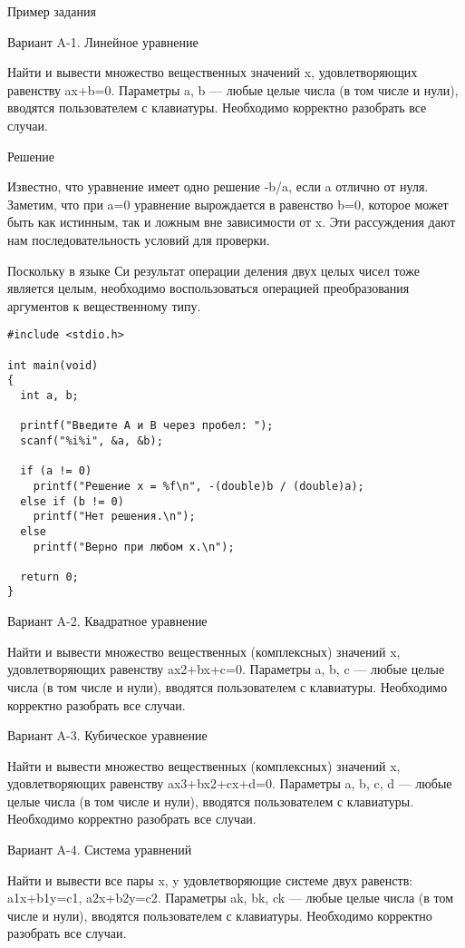 
Пример задания

Вариант A-1. Линейное уравнение

Найти и вывести множество вещественных значений x, удовлетворяющих равенству
ax+b=0. Параметры a, b — любые целые числа (в том числе и нули), вводятся
пользователем с клавиатуры. Необходимо корректно разобрать все случаи.

Решение

Известно, что уравнение имеет одно решение -b/a, если a отлично от нуля.
Заметим, что при a=0 уравнение вырождается в равенство b=0, которое может быть
как истинным, так и ложным вне зависимости от x. Эти рассуждения дают нам
последовательность условий для проверки.

Поскольку в языке Си результат операции деления двух целых чисел тоже является
целым, необходимо воспользоваться операцией преобразования аргументов к
вещественному типу.

\begin{verbatim}
#include <stdio.h>

int main(void)
{
  int a, b;

  printf("Введите A и B через пробел: ");
  scanf("%i%i", &a, &b);

  if (a != 0)
    printf("Решение x = %f\n", -(double)b / (double)a);
  else if (b != 0)
    printf("Нет решения.\n");
  else
    printf("Верно при любом x.\n");

  return 0;
}
\end{verbatim}


Вариант A-2. Квадратное уравнение

Найти и вывести множество вещественных (комплексных) значений x,
удовлетворяющих равенству ax2+bx+c=0. Параметры a, b, c — любые целые числа (в
том числе и нули), вводятся пользователем с клавиатуры. Необходимо корректно
разобрать все случаи.


Вариант A-3. Кубическое уравнение

Найти и вывести множество вещественных (комплексных) значений x,
удовлетворяющих равенству ax3+bx2+cx+d=0. Параметры a, b, c, d — любые целые
числа (в том числе и нули), вводятся пользователем с клавиатуры. Необходимо
корректно разобрать все случаи.


Вариант A-4. Система уравнений

Найти и вывести все пары x, y удовлетворяющие системе двух равенств:
a1x+b1y=c1, a2x+b2y=c2. Параметры ak, bk, ck — любые целые числа (в том числе
и нули), вводятся пользователем с клавиатуры. Необходимо корректно разобрать
все случаи.

